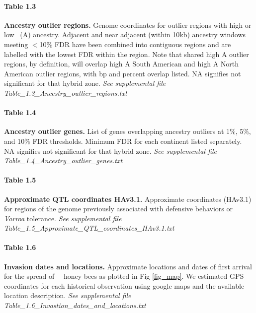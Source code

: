\paragraph*{Table 1.3}
\label{table_outliers}
{\bf Ancestry outlier regions.} Genome coordinates for outlier regions with high or low \scutellata\ (A) ancestry. Adjacent and near adjacent (within 10kb) ancestry windows meeting $<$10\% FDR have been combined into contiguous regions and are labelled with the lowest FDR within the region. Note that shared high A outlier regions, by definition, will overlap high A South American and high A North American outlier regions, with bp and percent overlap listed. NA signifies not significant for that hybrid zone.
\textit{See supplemental file Table\_1.3\_Ancestry\_outlier\_regions.txt}

\paragraph*{Table 1.4}
\label{table_genes}
{\bf Ancestry outlier genes.} List of genes overlapping ancestry outliers at 1\%, 5\%, and 10\% FDR thresholds. Minimum FDR for each continent listed separately. NA signifies not significant for that hybrid zone.
\textit{See supplemental file Table\_1.4\_Ancestry\_outlier\_genes.txt}

\paragraph*{Table 1.5}
\label{table_qtl}
{\bf Approximate QTL coordinates HAv3.1.} Approximate coordinates (HAv3.1) for regions of the genome previously associated with defensive behaviors or \textit{Varroa} tolerance.
\textit{See supplemental file Table\_1.5\_Approximate\_QTL\_coordinates\_HAv3.1.txt}

\paragraph*{Table 1.6}
\label{table_hx_dates}
{\bf Invasion dates and locations.} Approximate locations and dates of first arrival for the spread of \africanized\ \hyb\ honey bees as plotted in Fig \ref{fig_map}. We estimated GPS coordinates for each historical observation using google maps and the available location description.
\textit{See supplemental file Table\_1.6\_Invastion\_dates\_and\_locations.txt}
\newline


